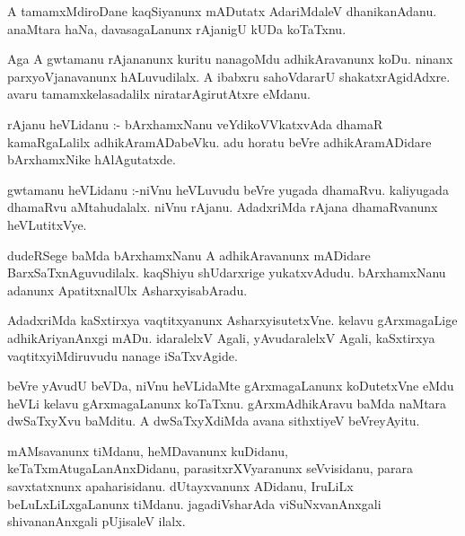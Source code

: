 \documentclass{article}
\begin{document}
\begin{mn}
A  tamamxMdiroDane  kaqSiyanunx  mADutatx  AdariMdaleV  dhanikanAdanu.  anaMtara  haNa,  davasagaLanunx  
rAjanigU  kUDa  koTaTxnu.
\end{mn}

\begin{mn}
Aga  A  gwtamanu  rAjananunx  kuritu  nanagoMdu  adhikAravanunx  koDu.  ninanx  parxyoVjanavanunx  hALuvudilalx.  
A  ibabxru  sahoVdararU  shakatxrAgidAdxre.  avaru  tamamxkelasadalilx  niratarAgirutAtxre  eMdanu.
\end{mn}

\begin{mn}
rAjanu  heVLidanu :- bArxhamxNanu  veYdikoVVkatxvAda  dhamaR  kamaRgaLalilx  adhikAramADabeVku.  
adu  horatu  beVre  adhikAramADidare  bArxhamxNike  hAlAgutatxde.
\end{mn}

\begin{mn}
gwtamanu  heVLidanu :-niVnu  heVLuvudu  beVre  yugada  dhamaRvu.  kaliyugada  dhamaRvu  aMtahudalalx.  
niVnu  rAjanu.  AdadxriMda  rAjana  dhamaRvanunx  heVLutitxVye.
\end{mn}

\begin{mn}
dudeRSege  baMda  bArxhamxNanu  A  adhikAravanunx  mADidare  BarxSaTxnAguvudilalx.  kaqShiyu  shUdarxrige  
yukatxvAdudu.  bArxhamxNanu  adanunx  ApatitxnalUlx  AsharxyisabAradu.
\end{mn}

\begin{mn}
AdadxriMda  kaSxtirxya  vaqtitxyanunx  AsharxyisutetxVne.  kelavu  gArxmagaLige  adhikAriyanAnxgi  mADu.  
idaralelxV  Agali,  yAvudaralelxV  Agali,  kaSxtirxya  vaqtitxyiMdiruvudu  nanage  iSaTxvAgide.
\end{mn}

\begin{mn}
beVre  yAvudU  beVDa,  niVnu  heVLidaMte  gArxmagaLanunx  koDutetxVne  eMdu  heVLi  kelavu  gArxmagaLanunx  
koTaTxnu.  gArxmAdhikAravu  baMda naMtara  dwSaTxyXvu  baMditu.  A  dwSaTxyXdiMda  avana  sithxtiyeV  beVreyAyitu.
\end{mn}

\begin{mn}
mAMsavanunx  tiMdanu,  heMDavanunx  kuDidanu,  keTaTxmAtugaLanAnxDidanu,  parasitxrXVyaranunx  seVvisidanu,  
parara  savxtatxnunx  apaharisidanu.  dUtayxvanunx  ADidanu,  IruLiLx  beLuLxLiLxgaLanunx  tiMdanu.  
jagadiVsharAda  viSuNxvanAnxgali  shivananAnxgali  pUjisaleV  ilalx.
\end{mn}
\end{document}
